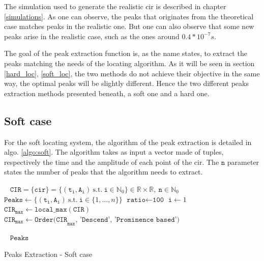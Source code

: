 The simulation used to generate the realistic \gls{cir} is described in chapter \ref{simulations}. As one can observe, the peaks that originates from the theoretical case matches peaks in the realistic one. But one can also observe that some new peaks arise in the realistic case, such as the ones around $0.4*10^{-7}s$. 
\vspace{2mm}

The goal of the peak extraction function is, as the name states, to extract the peaks matching the needs of the locating algorithm. As it will be seen in section \ref{hard_loc}, \ref{soft_loc}, the two methods do not achieve their objective in the same way, the optimal peaks will be slightly different. Hence the two different peaks extraction methods presented beneath, a soft one and a hard one.

\subsection{Soft case}

For the soft locating system, the algorithm of the peak extraction is detailed in algo. \ref{algo:soft}. The algorithm takes as input a vector made of tuples, respectively the time and the amplitude of each point of the \gls{cir}. The $\texttt{n}$ parameter states the number of peaks that the algorithm needs to extract.
\vspace{2mm}


\begin{algorithm}[H]
 \KwInput{}\
 \hspace*{\algorithmicindent} $\mathtt{CIR} = \{\mathtt{cir}\} = \{ (\mathtt{t_i}, \mathtt{A_i}) ~\text{s.t.} ~\mathtt{i} \in \mathbb{N}_0\} \in \mathbb{R} \times \mathbb{R}, ~\mathtt{n} \in \mathbb{N}_0$ \;
\KwInit{}
\hspace*{\algorithmicindent} $\texttt{Peaks} \longleftarrow \{ (\mathtt{t_i}, \mathtt{A_i}) ~\text{s.t.} ~\mathtt{i} \in \{ 1, ..., n \} \}$\;
\hspace*{\algorithmicindent} $\texttt{ratio} \longleftarrow \texttt{100}$\;
\hspace*{\algorithmicindent} $\texttt{i} \longleftarrow 1$\;
\hspace*{\algorithmicindent} $\texttt{CIR}_\texttt{max} \longleftarrow \texttt{local\_max}(\texttt{CIR})$\;
\hspace*{\algorithmicindent} $\texttt{CIR}_\texttt{max} \longleftarrow \texttt{Order(CIR}_\texttt{max}\texttt{, 'Descend', 'Prominence based')}$\;


 \KwOutput{}\
 \hspace*{\algorithmicindent} $\texttt{Peaks}$\;
 \caption{Peaks Extraction - Soft case \label{algo:soft}}
\end{algorithm}
\vspace{2mm}

